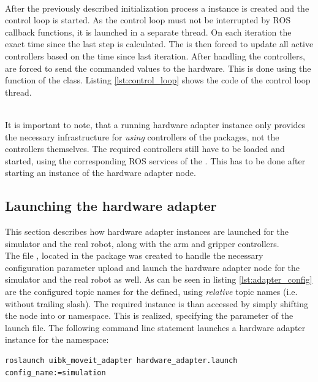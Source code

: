 \begin{minipage}{\linewidth}

\end{minipage} \\

After the previously described initialization process a  instance is created and the control loop is started. As the control loop must not be interrupted by ROS callback functions, it is launched in a separate thread. On each iteration the exact time since the last step is calculated. The  is then forced to update all active controllers based on the time since last iteration. After handling the controllers,  are forced to send the commanded values to the hardware. This is done using the  function of the  class. Listing \ref{lst:control_loop} shows the code of the control loop thread.

\begin{minipage}{\linewidth}

\end{minipage} \\

It is important to note, that a running hardware adapter instance only provides the necessary infrastructure for \emph{using} controllers of the  packages, not the controllers themselves. The required controllers still have to be loaded and started, using the corresponding ROS services of the . This has to be done after starting an instance of the hardware adapter node.

\subsection{Launching the hardware adapter}
\label{sec:launch_moveit}

This section describes how hardware adapter instances are launched for the simulator and the real robot, along with the arm and gripper controllers. \\

The file , located in the  package was created to handle the necessary configuration parameter upload and launch the hardware adapter node for the simulator and the real robot as well. As can be seen in listing \ref{lst:adapter_config} are the configured topic names for the  defined, using \emph{relative} topic names (i.e. without trailing slash). The required instance is than accessed by simply shifting the node into  or  namespace. This is realized, specifying the  parameter of the launch file. The following command line statement launches a hardware adapter instance for the  namespace:
\begin{verbatim}
roslaunch uibk_moveit_adapter hardware_adapter.launch config_name:=simulation
\end{verbatim}

